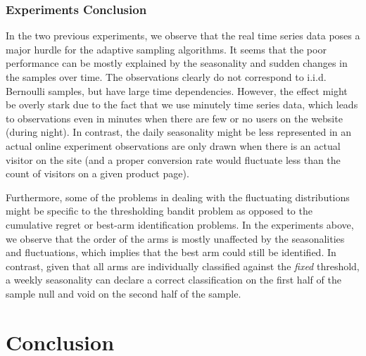 \documentclass[11pt,]{article}
\begin{document}
\subsubsection{Experiments Conclusion}\label{experiments-conclusion}

In the two previous experiments, we observe that the real time series
data poses a major hurdle for the adaptive sampling algorithms. It seems
that the poor performance can be mostly explained by the seasonality and
sudden changes in the samples over time. The observations clearly do not
correspond to i.i.d. Bernoulli samples, but have large time
dependencies. However, the effect might be overly stark due to the fact
that we use minutely time series data, which leads to observations even
in minutes when there are few or no users on the website (during night).
In contrast, the daily seasonality might be less represented in an
actual online experiment observations are only drawn when there is an
actual visitor on the site (and a proper conversion rate would fluctuate
less than the count of visitors on a given product page).

Furthermore, some of the problems in dealing with the fluctuating
distributions might be specific to the thresholding bandit problem as
opposed to the cumulative regret or best-arm identification problems. In
the experiments above, we observe that the order of the arms is mostly
unaffected by the seasonalities and fluctuations, which implies that the
best arm could still be identified. In contrast, given that all arms are
individually classified against the \emph{fixed} threshold, a weekly
seasonality can declare a correct classification on the first half of
the sample null and void on the second half of the sample.

\section{Conclusion}\label{conclusion-1}
\end{document}
